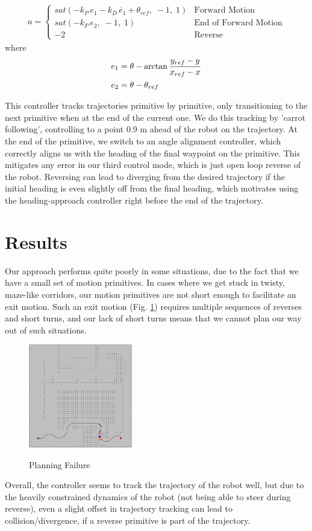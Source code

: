 \documentclass{article}
\begin{document}
\begin{align*}
u =
\begin{cases}
sat(-k_P\,e_1 - k_D\,\dot{e_1} + \theta_{ref},\; -1,\; 1) & \text{Forward Motion}\\
sat(-k_P\,e_2,\; -1,\; 1) & \text{End of Forward Motion}\\
-2 & \text{Reverse}
\end{cases}
\end{align*}
where 
\begin{align*}
\centering
e_1 &= \theta - \arctan{\frac{y_{ref} - y}{x_{ref} - x}}\\
e_2 &= \theta - \theta_{ref}
\end{align*}

This controller tracks trajectories primitive by primitive, only transitioning to the next primitive when at the end of the current one. We do this tracking by 'carrot following', controlling to a point 0.9 m ahead of the robot on the trajectory. At the end of the primitive, we switch to an angle alignment controller, which correctly aligns us with the heading of the final waypoint on the primitive. This mitigates any error in our third control mode, which is just open loop reverse of the robot. Reversing can lead to diverging from the desired trajectory if the initial heading is even slightly off from the final heading, which motivates using the heading-approach controller right before the end of the trajectory.

\section{Results}



Our approach performs quite poorly in some situations, due to the fact that we have a small set of motion primitives. In cases where we get stuck in twisty, maze-like corridors, our motion primitives are not short enough to facilitate an exit motion. Such an exit motion (Fig. \ref{fig:stuck}) requires multiple sequences of reverses and short turns, and our lack of short turns means that we cannot plan our way out of such situations.

\begin{figure}[!]
\centering
\includegraphics[width=128pt,keepaspectratio]{figures/stuck_in_map2_S.png}\\
\caption{Planning Failure}
\label{fig:stuck}
\end{figure}

Overall, the controller seems to track the trajectory of the robot well, but due to the heavily constrained dynamics of the robot (not being able to steer during reverse), even a slight offset in trajectory tracking can lead to collision/divergence, if a reverse primitive is part of the trajectory.
\end{document}
